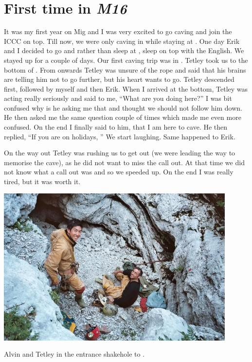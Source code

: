 \section{\texorpdfstring{First time in
\emph{M16}}{First time in M16}}


It was my first year on Mig and I was very excited to go caving and join
the ICCC on top. Till now, we were only caving in  while
staying at . One day Erik and I decided to go and rather than sleep
at , sleep on top with the English. We stayed up for a couple of
days. Our first caving trip was in . Tetley took us to the
bottom of . From  onwards Tetley was unsure of the rope and
said that his brains are telling him not to go further, but his heart
wants to go. Tetley descended  first, followed by myself and then
Erik. When I arrived at the bottom, Tetley was acting really seriously
and said to me, ``What are you doing here?'' I was bit confused why is he
asking me that and thought we should not follow him down. He then asked
me the same question couple of times which made me even more confused.
On the end I finally said to him, that I am here to cave. He then
replied, ``If you are on holidays, '' We start laughing. Same happened to Erik.

On the way out Tetley was rushing us to get out (we were leading the way
to memorise the cave), as he did not want to miss the call out. At that
time we did not know what a call out was and so we speeded up. On the
end I was really tired, but it was worth it.


\begin{pagefigure}
\checkoddpage \ifoddpage \forcerectofloat \else \forceversofloat \fi
   \centering
\includegraphics[width = 0.9\textwidth]{2007/m16/jarvist frost gr1 film1 -004_1--orig.jpg}
\caption{Alvin and Tetley in the entrance shakehole to \protect{}. }
\end{pagefigure}
